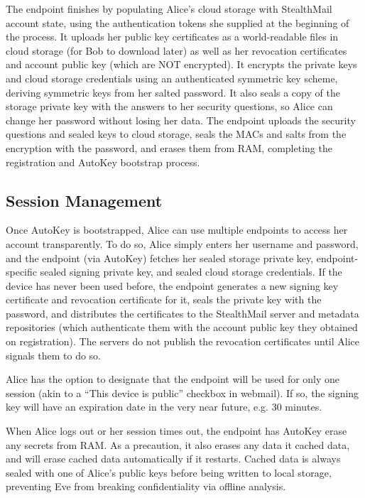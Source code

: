 The endpoint finishes by populating Alice’s cloud storage with StealthMail account state, using the authentication tokens she supplied at the beginning of the process.  It uploads her public key certificates as a world-readable files in cloud storage (for Bob to download later) as well as her revocation certificates and account public key (which are NOT encrypted).  It encrypts the private keys and cloud storage credentials using an authenticated symmetric key scheme, deriving symmetric keys from her salted password.  It also seals a copy of the storage private key with the answers to her security questions, so Alice can change her password without losing her data.  The endpoint uploads the security questions and sealed keys to cloud storage, seals the MACs and salts from the encryption with the password, and erases them from RAM, completing the registration and AutoKey bootstrap process.

\subsection{Session Management}
Once AutoKey is bootstrapped, Alice can use multiple endpoints to access her account transparently.  To do so, Alice simply enters her username and password, and the endpoint (via AutoKey) fetches her sealed storage private key, endpoint-specific sealed signing private key, and sealed cloud storage credentials.  If the device has never been used before, the endpoint generates a new signing key certificate and revocation certificate for it, seals the private key with the password, and distributes the certificates to the StealthMail server and metadata repositories (which authenticate them with the account public key they obtained on registration).  The servers do not publish the revocation certificates until Alice signals them to do so.

Alice has the option to designate that the endpoint will be used for only one session (akin to a ``This device is public'' checkbox in webmail).  If so, the signing key will have an expiration date in the very near future, e.g. 30 minutes.

When Alice logs out or her session times out, the endpoint has AutoKey erase any secrets from RAM.  As a precaution, it also erases any data it cached data, and will erase cached data automatically if it restarts. Cached data is always sealed with one of Alice's public keys before being written to local storage, preventing Eve from breaking confidentiality via offline analysis.

